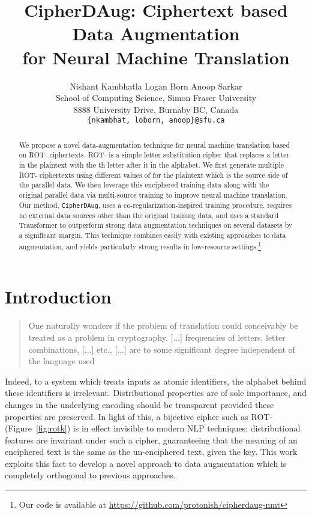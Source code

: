 \documentclass[11pt]{article}
\title{CipherDAug: Ciphertext based Data Augmentation \\for Neural Machine Translation}
\author{Nishant Kambhatla \hspace{1em} Logan Born \hspace{1em} Anoop Sarkar\\
  School of Computing Science, Simon Fraser University \\
  8888 University Drive, Burnaby BC, Canada \\
  \texttt{\{nkambhat, loborn, anoop\}@sfu.ca} \\}
\begin{document}
\maketitle
\begin{abstract}
We propose a novel data-augmentation technique for neural machine translation based on ROT- ciphertexts. ROT- is a simple letter substitution cipher that replaces a letter in the plaintext with the th letter after it in the alphabet. We first generate multiple ROT- ciphertexts using different values of  for the plaintext which is the source side of the parallel data. We then leverage this enciphered training data along with the original parallel data via multi-source training to improve neural machine translation. Our method, \texttt{CipherDAug}, uses a co-regularization-inspired training procedure, requires no external data sources other than the original training data, and uses a standard Transformer to outperform strong data augmentation techniques on several datasets by a significant margin. This technique combines easily with existing approaches to data augmentation, and yields particularly strong results in low-resource settings.\footnote{Our code is available at \url{https://github.com/protonish/cipherdaug-nmt}}
\end{abstract}

\section{Introduction}

\begin{quote}\small
One naturally wonders if the problem of translation could 
conceivably be treated as a problem in cryptography. [...] frequencies of letters, letter combinations, [...] etc., [...] are to some significant degree independent of the language used \cite{weaver-translation}
\end{quote}
Indeed, to a system which treats inputs as atomic identifiers, the alphabet
behind these identifiers is irrelevant. Distributional properties are of sole importance, and changes in the underlying encoding should be transparent provided these properties are preserved. 
In light of this, a bijective cipher such as ROT- (Figure~\ref{fig:rotk}) is in effect invisible to modern NLP techniques:
distributional features are invariant under such a cipher, guaranteeing 
that the meaning of an enciphered text is the same as the un-enciphered text, given the key.
This work exploits this fact to develop a novel approach to data augmentation which is completely orthogonal to previous approaches.
\end{document}
